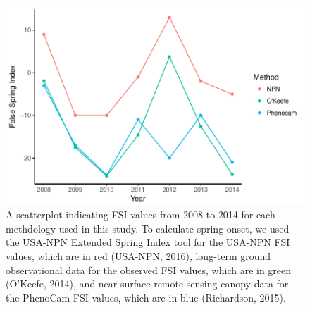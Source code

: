 \documentclass{article}\usepackage[]{graphicx}\usepackage[]{color}
\makeatletter
\def\maxwidth{ %
  \ifdim\Gin@nat@width>\linewidth
    \linewidth
  \else
    \Gin@nat@width
  \fi
}
\makeatother
\begin{document}
\begin{figure}[H]

{\centering \includegraphics[width=\maxwidth]{figure/fsifig-1} 

}

\caption[A scatterplot indicating FSI values from 2008 to 2014 for each methdology used in this study]{A scatterplot indicating FSI values from 2008 to 2014 for each methdology used in this study. To calculate spring onset, we used the USA-NPN Extended Spring Index tool for the USA-NPN FSI values, which are in red (USA-NPN, 2016), long-term ground observational data for the observed FSI values, which are in green (O'Keefe, 2014), and near-surface remote-sensing canopy data for the PhenoCam FSI values, which are in blue (Richardson, 2015).}\label{fig:fsifig}
\end{figure}
\end{document}
